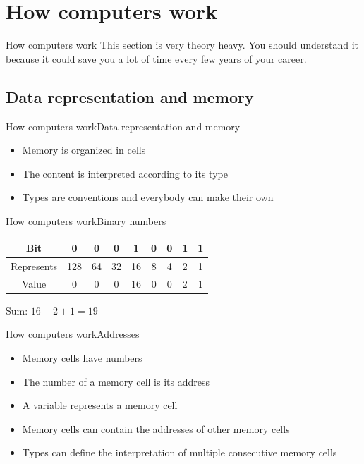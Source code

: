 \documentclass[aspectratio=169]{beamer}
\begin{document}
\section{How computers work}
\begin{frame}{How computers work}
	This section is very theory heavy.
	You should understand it because it could save you a lot of time every few years of your career.
\end{frame}

\subsection{Data representation and memory}
\begin{frame}{How computers work}{Data representation and memory}
\begin{itemize}
	\item Memory is organized in cells
	\item The content is interpreted according to its type
	\item Types are conventions and everybody can make their own
\end{itemize}
\end{frame}

\begin{frame}{How computers work}{Binary numbers}

\begin{tabular}{c|cccccccc}
	Bit        & 0   & 0  & 0  & 1  & 0 & 0 & 1 & 1 
	\pause
	\\ \hline
	Represents & 128 & 64 & 32 & 16 & 8 & 4 & 2 & 1 \\ 
	Value      & 0   & 0  & 0  & 16 & 0 & 0 & 2 & 1 \\
\end{tabular}
\pause
\vspace{2em}

Sum:
\begin{math}
	16 + 2 + 1 = 19
\end{math}
\end{frame}

\begin{frame}{How computers work}{Addresses}
\begin{itemize}
	\item Memory cells have numbers
	\item The number of a memory cell is its address
	\item A variable represents a memory cell
	\pause
	\item Memory cells can contain the addresses of other memory cells
	\item Types can define the interpretation of multiple consecutive memory cells
\end{itemize}
\end{frame}
\end{document}
